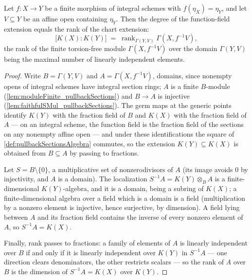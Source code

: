 \begin{theorem}
  \label{thm:finrank_functionField_eq_finrank_pullbackSections}
  \leanok
  Let \(f : X \to Y\) be a finite morphism of integral schemes with
  \(f(\eta_X) = \eta_Y\), and let \(V \subseteq Y\) be an affine open containing
  \(\eta_Y\). Then the degree of the function-field extension equals the rank of the
  chart extension:
  \[
    \bigl[K(X) : K(Y)\bigr]
      \;=\; \operatorname{rank}_{\Gamma(Y, V)} \Gamma(X, f^{-1}V),
  \]
  the rank of the finite torsion-free module \(\Gamma(X, f^{-1}V)\) over the domain
  \(\Gamma(Y, V)\) being the maximal number of linearly independent elements.
\end{theorem}
\begin{proof}
  \leanok
  Write \(B = \Gamma(Y, V)\) and \(A = \Gamma(X, f^{-1}V)\), domains, since nonempty
  opens of integral schemes have integral section rings; \(A\) is a finite \(B\)-module
  (\ref{lem:moduleFinite_pullbackSections}) and \(B \to A\) is injective
  (\ref{lem:faithfulSMul_pullbackSections}). The germ maps at the generic points
  identify \(K(Y)\) with the fraction field of \(B\) and \(K(X)\) with the fraction
  field of \(A\) --- on an integral scheme, the function field is the fraction field of
  the sections on any nonempty affine open --- and under these identifications the
  square of \ref{def:pullbackSectionsAlgebra} commutes, so the extension
  \(K(Y) \subseteq K(X)\) is obtained from \(B \subseteq A\) by passing to fractions.

  Let \(S = B \setminus \{0\}\), a multiplicative set of nonzerodivisors of \(A\) (its
  image avoids \(0\) by injectivity, and \(A\) is a domain). The localization
  \(S^{-1}A = K(Y) \otimes_B A\) is a finite-dimensional \(K(Y)\)-algebra, and it is a
  domain, being a subring of \(K(X)\); a finite-dimensional algebra over a field which
  is a domain is a field (multiplication by a nonzero element is injective, hence
  surjective, by dimension). A field lying between \(A\) and its fraction field
  contains the inverse of every nonzero element of \(A\), so \(S^{-1}A = K(X)\).

  Finally, rank passes to fractions: a family of elements of \(A\) is linearly
  independent over \(B\) if and only if it is linearly independent over \(K(Y)\) in
  \(S^{-1}A\) --- one direction clears denominators, the other restricts scalars ---
  so the rank of \(A\) over \(B\) is the dimension of \(S^{-1}A = K(X)\) over
  \(K(Y)\).
\end{proof}


